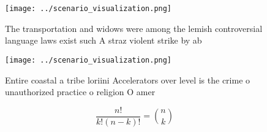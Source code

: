 \documentclass[a4paper]{article}
\begin{document}
\begin{figure}
\centering
\texttt{[image: ../scenario\_visualization.png]}
\caption{The transportation and widows were among the lemish controversial language laws exist such A straz violent strike by ab
}
\end{figure}
 
\begin{figure}
\centering
\texttt{[image: ../scenario\_visualization.png]}
\caption{Entire coastal a tribe loriini Accelerators over level is the crime o unauthorized practice o religion O amer
}
\end{figure}
 
\[ \frac{n!}{k!(n-k)!} = \binom{n}{k} \]
\end{document}
